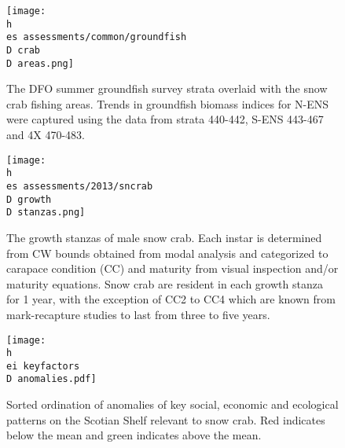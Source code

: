 \documentclass[11pt]{article}
\newcommand{\D}{.}
\newcommand{\h}{/home/hubleyb/}
\newcommand{\es}{bio.data/bio.snowcrab/}
\newcommand{\ei}{bio.data/bio.indicators/}
\begin{document}



\begin{figure}
\centering
\texttt{[image: \\h \\es assessments/common/groundfish\\D crab\\D areas.png]}
\caption{The DFO summer groundfish survey strata overlaid with the snow crab fishing areas. Trends in groundfish biomass indices for N-ENS were captured using the data from strata 440-442, S-ENS 443-467 and 4X 470-483.}
\end{figure}
\clearpage




\begin{figure}
\centering
\texttt{[image: \\h \\es assessments/2013/sncrab\\D growth\\D stanzas.png]}
\caption{The growth stanzas of male snow crab. Each instar is determined from CW bounds obtained from modal analysis and categorized to carapace condition (CC) and maturity from visual inspection and/or maturity equations. Snow crab are resident in each growth stanza for 1 year, with the exception of CC2 to CC4 which are known from mark-recapture studies to last from three to five years.}
\end{figure}
\clearpage

\begin{figure}
\centering
\texttt{[image: \\h \\ei keyfactors\\D anomalies.pdf]}
\caption{Sorted ordination of anomalies of key social, economic and ecological patterns on the Scotian Shelf relevant to snow crab. Red indicates below the mean and green indicates above the mean.}
\end{figure}
\clearpage
\end{document}
